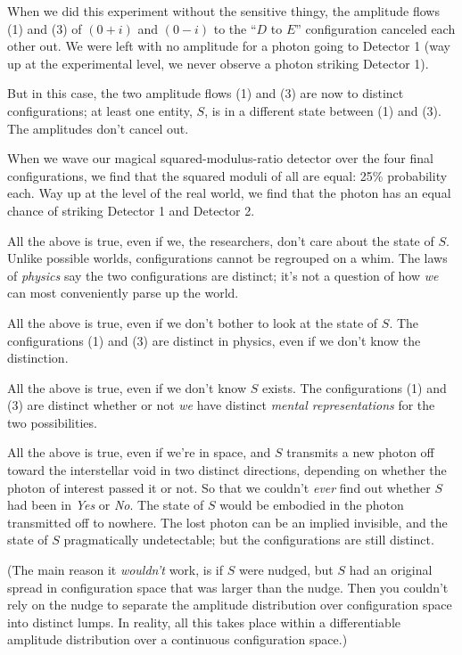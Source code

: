 {
 When we did this experiment without the sensitive thingy, the
amplitude flows (1) and (3) of $(0 + i)$ and $(0 - i)$ to the
``$D$ to $E$'' configuration canceled
each other out. We were left with no amplitude for a photon going to
Detector 1 (way up at the experimental level, we never observe a photon
striking Detector 1).}

{
 But in this case, the two amplitude flows (1) and (3) are now to
distinct configurations; at least one entity, $S$, is in a different
state between (1) and (3). The amplitudes don't cancel
out.}

{
 When we wave our magical squared-modulus-ratio detector over the
four final configurations, we find that the squared moduli of all are
equal: 25\% probability each. Way up at the level of the real world, we
find that the photon has an equal chance of striking Detector 1 and
Detector 2.}

{
 All the above is true, even if we, the researchers,
don't care about the state of $S$. Unlike possible
worlds, configurations cannot be regrouped on a whim. The laws of
\textit{physics} say the two configurations are distinct;
it's not a question of how \textit{we} can most
conveniently parse up the world.}

{
 All the above is true, even if we don't bother to
look at the state of $S$. The configurations (1) and (3) are distinct in
physics, even if we don't know the distinction.}

{
 All the above is true, even if we don't know $S$
exists. The configurations (1) and (3) are distinct whether or not
\textit{we} have distinct \textit{mental representations} for the two
possibilities.}

{
 All the above is true, even if we're in space, and
$S$ transmits a new photon off toward the interstellar void in two
distinct directions, depending on whether the photon of interest passed
it or not. So that we couldn't \textit{ever} find out
whether $S$ had been in \textit{Yes} or \textit{No}. The state of $S$ would
be embodied in the photon transmitted off to nowhere. The lost photon
can be an implied invisible, and the state of $S$ pragmatically
undetectable; but the configurations are still distinct.}

{
 (The main reason it \textit{wouldn't} work, is if
$S$ were nudged, but $S$ had an original spread in configuration space that
was larger than the nudge. Then you couldn't rely on
the nudge to separate the amplitude distribution over configuration
space into distinct lumps. In reality, all this takes place within a
differentiable amplitude distribution over a continuous configuration
space.)}

